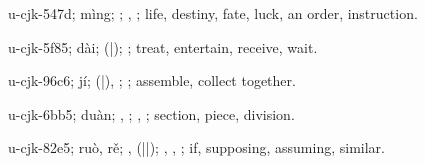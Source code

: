 \begin{multicols}{2}
{\cjkgGlue{}u-cjk-547d; mìng; \cjkgGlue{}; \cjkgGlue{}, \cjkgGlue{}; life, destiny, fate, luck, an order, instruction.

\cjkgGlue{}u-cjk-5f85; dài; \cjkgGlue{}\cjkgGlue{}(\cjkgGlue{}|\cjkgGlue{}); \cjkgGlue{}; treat, entertain, receive, wait.

\cjkgGlue{}u-cjk-96c6; jí; \cjkgGlue{}\cjkgGlue{}(\cjkgGlue{}|\cjkgGlue{}), \cjkgGlue{}\cjkgGlue{}\cjkgGlue{}; \cjkgGlue{}; assemble, collect together.

\cjkgGlue{}u-cjk-6bb5; duàn; \cjkgGlue{}, \cjkgGlue{}; \cjkgGlue{}, \cjkgGlue{}; section, piece, division.

\cjkgGlue{}u-cjk-82e5; ruò, rě; \cjkgGlue{}\cjkgGlue{}\cjkgGlue{}, \cjkgGlue{}\cjkgGlue{}(\cjkgGlue{}|\cjkgGlue{}|\cjkgGlue{}); \cjkgGlue{}, \cjkgGlue{}, \cjkgGlue{}; if, supposing, assuming, similar.

}
\end{multicols}
